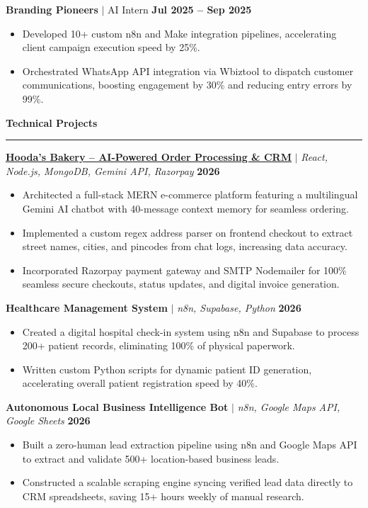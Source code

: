 \documentclass[letterpaper,10pt]{article}
\newcommand{\resumeSection}[2]{
  \vspace{4pt}
  \textbf{\large\color{primaryblue}#1\hspace{0.5em}#2}
  \vspace{1pt}
  {\color{primaryblue}\hrule}
  \vspace{2.5pt}
}
\begin{document}
\vspace{2.5pt}
\noindent
\textbf{Branding Pioneers} $|$ AI Intern \hfill \textbf{Jul 2025 -- Sep 2025}
\begin{itemize}
    \item Developed 10+ custom n8n and Make integration pipelines, accelerating client campaign execution speed by 25\%.
    \item Orchestrated WhatsApp API integration via Wbiztool to dispatch customer communications, boosting engagement by 30\% and reducing entry errors by 99\%.
\end{itemize}


\resumeSection{\faCode}{Technical Projects}

\noindent
\href{https://hoodas-bakery.vercel.app}{\color{primaryblue}\textbf{Hooda's Bakery -- AI-Powered Order Processing \& CRM}} $|$ \textit{React, Node.js, MongoDB, Gemini API, Razorpay} \hfill \textbf{2026}
\begin{itemize}
    \item Architected a full-stack MERN e-commerce platform featuring a multilingual Gemini AI chatbot with 40-message context memory for seamless ordering.
    \item Implemented a custom regex address parser on frontend checkout to extract street names, cities, and pincodes from chat logs, increasing data accuracy.
    \item Incorporated Razorpay payment gateway and SMTP Nodemailer for 100\% seamless secure checkouts, status updates, and digital invoice generation.
\end{itemize}

\vspace{2.5pt}
\noindent
\textbf{Healthcare Management System} $|$ \textit{n8n, Supabase, Python} \hfill \textbf{2026}
\begin{itemize}
    \item Created a digital hospital check-in system using n8n and Supabase to process 200+ patient records, eliminating 100\% of physical paperwork.
    \item Written custom Python scripts for dynamic patient ID generation, accelerating overall patient registration speed by 40\%.
\end{itemize}

\vspace{2.5pt}
\noindent
\textbf{Autonomous Local Business Intelligence Bot} $|$ \textit{n8n, Google Maps API, Google Sheets} \hfill \textbf{2026}
\begin{itemize}
    \item Built a zero-human lead extraction pipeline using n8n and Google Maps API to extract and validate 500+ location-based business leads.
    \item Constructed a scalable scraping engine syncing verified lead data directly to CRM spreadsheets, saving 15+ hours weekly of manual research.
\end{itemize}
\end{document}
